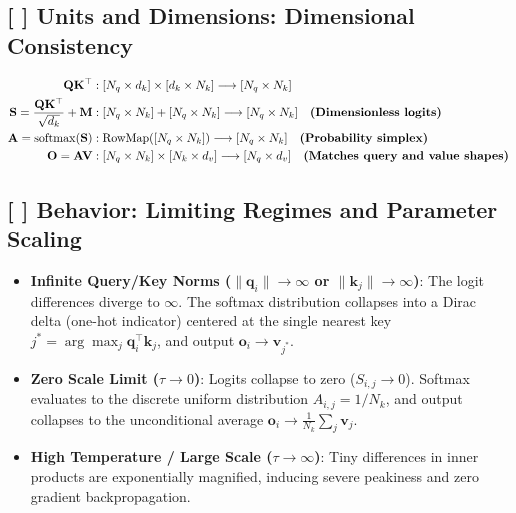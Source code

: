 \documentclass[11pt,a4paper]{article}
\theoremstyle{definition}
\begin{document}
\subsection{[ ] Units and Dimensions: Dimensional Consistency}
{\boldmath
\begin{align}
\mathbf{Q}\mathbf{K}^\top &: [N_q \times d_k] \times [d_k \times N_k] \longrightarrow [N_q \times N_k] \\
\mathbf{S} = \frac{\mathbf{Q}\mathbf{K}^\top}{\sqrt{d_k}} + \mathbf{M} &: [N_q \times N_k] + [N_q \times N_k] \longrightarrow [N_q \times N_k] \quad \text{\textbf{(Dimensionless logits)}} \\
\mathbf{A} = \operatorname{softmax}(\mathbf{S}) &: \operatorname{RowMap}([N_q \times N_k]) \longrightarrow [N_q \times N_k] \quad \text{\textbf{(Probability simplex)}} \\
\mathbf{O} = \mathbf{A}\mathbf{V} &: [N_q \times N_k] \times [N_k \times d_v] \longrightarrow [N_q \times d_v] \quad \text{\textbf{(Matches query and value shapes)}}
\end{align}
}

\subsection{[ ] Behavior: Limiting Regimes and Parameter Scaling}
\begin{itemize}
    \item \textbf{Infinite Query/Key Norms ($\|\mathbf{q}_i\| \to \infty$ or $\|\mathbf{k}_j\| \to \infty$)}: The logit differences diverge to $\infty$. The softmax distribution collapses into a Dirac delta (one-hot indicator) centered at the single nearest key $j^* = \arg\max_j \mathbf{q}_i^\top \mathbf{k}_j$, and output $\mathbf{o}_i \to \mathbf{v}_{j^*}$.
    \item \textbf{Zero Scale Limit ($\tau \to 0$)}: Logits collapse to zero ($S_{i, j} \to 0$). Softmax evaluates to the discrete uniform distribution $A_{i, j} = 1/N_k$, and output collapses to the unconditional average $\mathbf{o}_i \to \frac{1}{N_k}\sum_j \mathbf{v}_j$.
    \item \textbf{High Temperature / Large Scale ($\tau \to \infty$)}: Tiny differences in inner products are exponentially magnified, inducing severe peakiness and zero gradient backpropagation.
\end{itemize}
\end{document}
